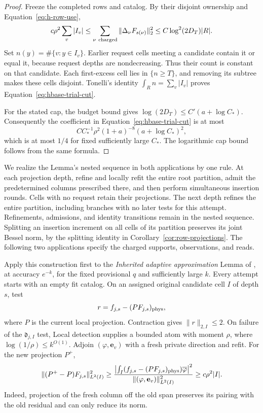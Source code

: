 \begin{proof}
Freeze the completed rows and catalog.  By their disjoint ownership
and Equation~\eqref{eq:h-row-use},
\[
 c\rho^2\sum_v|I_v|
 \le\sum_{\nu\ {\rm charged}}\|\Delta_\nu F_{s(\nu)}\|_2^2
 \le C\log^2(2D_T)|R|.
\]
Set \(n(y)=\#\{v:y\in I_v\}\).  Earlier request cells meeting a
candidate contain it or equal it, because request depths are
nondecreasing.  Thus their count is constant on that candidate.
Each first-excess cell lies in \(\{n\ge T\}\), and removing its
subtree makes these cells disjoint.  Tonelli's identity
\(\int_R n=\sum_v|I_v|\) proves
Equation~\eqref{eq:hbase-trial-cut}.

For the stated cap, the budget bound gives
\(\log(2D_T)\le C'(a+\log C_*)\).  Consequently the coefficient
in Equation~\eqref{eq:hbase-trial-cut} is at most
\[
 C C_*^{-1}\rho^2(1+a)^{-8}(a+\log C_*)^2,
\]
which is at most \(1/4\) for fixed sufficiently large \(C_*\).
The logarithmic cap bound follows from the same formula.
\end{proof}

We realize the Lemma's nested sequence in both applications by one
rule.  At each projection depth, refine and locally refit the entire
root partition, admit the predetermined columns prescribed there,
and then perform simultaneous insertion rounds.  Cells with no
request retain their projections.  The next depth refines the entire
partition, including branches with no later tests for this attempt.
Refinements, admissions, and identity transitions remain in the
nested sequence.  Splitting an insertion increment on all cells of
its partition preserves its joint Bessel norm, by the splitting
identity in Corollary~\ref{cor:row-projections}.  The following two
applications specify the charged supports, observations, and reads.

Apply this construction first to the
\emph{Inherited adaptive approximation} Lemma of
\cite[Section~5]{H}, at accuracy \(e^{-k}\), for the fixed provisional
\(q\) and sufficiently large \(k\).  Every attempt starts with an
empty fit catalog.  On an assigned original candidate cell \(I\) of
depth \(s\), test
\[
 r=f_{j,s}-(PF_{j,s})_{\rm phys},
\]
where \(P\) is the current local projection.  Contraction gives
\(\|r\|_{2,I}\le2\).  On failure of the \(\mathfrak d_{j,I}\)
test, Local detection supplies a bounded atom with moment \(\rho\),
where \(\log(1/\rho)\le k^{O(1)}\).  Adjoin
\((\varphi,\mathbf e_v)\) with a fresh private direction and refit.
For the new projection \(P^+\),
\begin{equation}
 \|(P^+-P)F_{j,s}\|_{L^2(I)}^2
 \ge
 \frac{\left|\int_I
  (f_{j,s}-(PF_{j,s})_{\rm phys})\overline\varphi\right|^2}
      {\|(\varphi,\mathbf e_v)\|_{L^2(I)}^2}
 \ge c\rho^2|I|.                                               \label{eq:hbase-fresh-gain}
\end{equation}
Indeed, projection of the fresh column off the old span preserves
its pairing with the old residual and can only reduce its norm.

